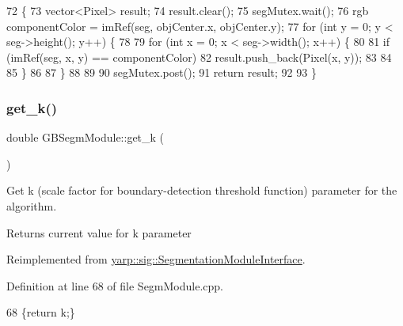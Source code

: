 \begin{DoxyCode}
72 \{
73     vector<Pixel> result;
74     result.clear();
75     segMutex.wait();
76     rgb componentColor = imRef(seg, objCenter.x, objCenter.y);
77     \textcolor{keywordflow}{for} (\textcolor{keywordtype}{int} y = 0; y < seg->height(); y++) \{
78 
79             \textcolor{keywordflow}{for} (\textcolor{keywordtype}{int} x = 0; x < seg->width(); x++) \{
80 
81               \textcolor{keywordflow}{if} (imRef(seg, x, y) == componentColor)
82                 result.push\_back(Pixel(x, y));
83 
84 
85             \}
86 
87         \}
88 
89     
90     segMutex.post();
91     \textcolor{keywordflow}{return} result;
92 
93 \}
\end{DoxyCode}
\mbox{\label{classGBSegmModule_a44bab99aa7a035e57a185673c040d2f6}} 
\subsubsection{\texorpdfstring{get\+\_\+k()}{get\_k()}}
{\footnotesize\ttfamily double G\+B\+Segm\+Module\+::get\+\_\+k (\begin{DoxyParamCaption}{ }\end{DoxyParamCaption})\hspace{0.3cm}{\ttfamily [virtual]}}



Get k (scale factor for boundary-\/detection threshold function) parameter for the algorithm. 

\begin{DoxyReturn}{Returns}
current value for k parameter 
\end{DoxyReturn}


Reimplemented from \hyperlink{classyarp_1_1sig_1_1SegmentationModuleInterface_a91f3d872a48599337d1d2f365ac4c31e}{yarp\+::sig\+::\+Segmentation\+Module\+Interface}.



Definition at line 68 of file Segm\+Module.\+cpp.


\begin{DoxyCode}
68 \{\textcolor{keywordflow}{return} k;\}
\end{DoxyCode}
\mbox{\label{classGBSegmModule_a2378b95e60b406a119947aa86b5bb9c4}} 
